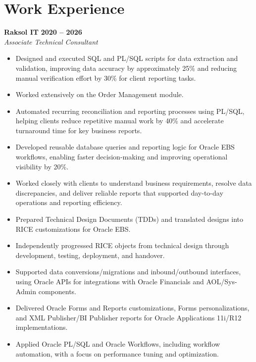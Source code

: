 \documentclass[11pt,a4paper]{article}
\begin{document}
\section*{Work Experience}
\textbf{Raksol IT} \hfill \textbf{2020 -- 2026}\\
\textit{Associate Technical Consultant}
\begin{itemize}
    \item Designed and executed SQL and PL/SQL scripts for data extraction and validation, improving data accuracy by approximately 25\% and reducing manual verification effort by 30\% for client reporting tasks.
    \item Worked extensively on the Order Management module.
    \item Automated recurring reconciliation and reporting processes using PL/SQL, helping clients reduce repetitive manual work by 40\% and accelerate turnaround time for key business reports.
    \item Developed reusable database queries and reporting logic for Oracle EBS workflows, enabling faster decision-making and improving operational visibility by 20\%.
    \item Worked closely with clients to understand business requirements, resolve data discrepancies, and deliver reliable reports that supported day-to-day operations and reporting efficiency.
    \item Prepared Technical Design Documents (TDDs) and translated designs into RICE customizations for Oracle EBS.
    \item Independently progressed RICE objects from technical design through development, testing, deployment, and handover.
    \item Supported data conversions/migrations and inbound/outbound interfaces, using Oracle APIs for integrations with Oracle Financials and AOL/Sys-Admin components.
    \item Delivered Oracle Forms and Reports customizations, Forms personalizations, and XML Publisher/BI Publisher reports for Oracle Applications 11i/R12 implementations.
    \item Applied Oracle PL/SQL and Oracle Workflows, including workflow automation, with a focus on performance tuning and optimization.
\end{itemize}
\end{document}
